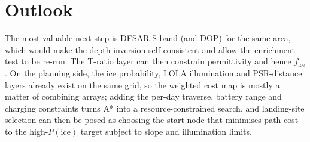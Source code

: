 \documentclass[11pt,a4paper]{article}
\newcommand{\Pice}{P(\text{ice})}
\begin{document}
\section{Outlook}

The most valuable next step is DFSAR S-band (and DOP) for the same area, which would make the
depth inversion self-consistent and allow the enrichment test to be re-run. The T-ratio layer can
then constrain permittivity and hence $f_{\mathrm{ice}}$. On the planning side, the ice
probability, LOLA illumination and PSR-distance layers already exist on the same grid, so the
weighted cost map is mostly a matter of combining arrays; adding the per-day traverse, battery
range and charging constraints turns A* into a resource-constrained search, and landing-site
selection can then be posed as choosing the start node that minimises path cost to the
high-$\Pice$ target subject to slope and illumination limits.
\end{document}
